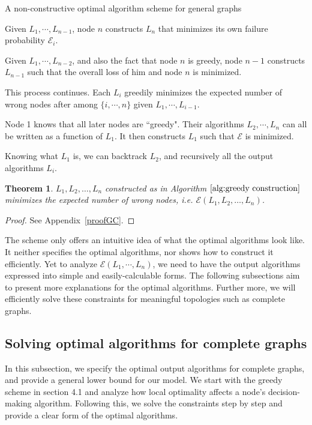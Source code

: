 \documentclass[a4paper,UKenglish]{lipics}
\newtheorem{thm}{Theorem}[section] %
\theoremstyle{definition}
\begin{document}
\begin{algorithm}[htb]
\caption{A non-constructive optimal algorithm scheme for general graphs}
\begin{algorithmic}[1]
\label{alg:greedy construction}
\STATE Given $L_1, \dotsb, L_{n-1}$, node $n$ constructs $L_n$ that minimizes its own failure probability $\mathcal{E}_i$.

\STATE Given $L_1, \dotsb, L_{n-2}$, and also the fact that node $n$ is greedy,
		 node $n - 1$ constructs $L_{n-1}$ such that the overall loss of him and node $n$ is minimized.

\STATE This process continues. Each $L_i$ greedily minimizes the expected number of wrong nodes after among $\{i, \dotsb, n\}$
		 given $L_1, \dotsb, L_{i-1}$. 

\STATE Node 1 knows that all later nodes are ``greedy".
	Their algorithms $L_2, \dotsb, L_n$ can all be written as a function of $L_1$. 
	It then constructs $L_1$ such that $\mathcal{E}$ is minimized.

\STATE Knowing what $L_1$ is, we can backtrack $L_2$, and recursively all the output algorithms $L_i$.
\end{algorithmic}
\end{algorithm}

\begin{thm}
\label{localimpliesoverall}
$L_1, L_2, \dots, L_n$ constructed as in Algorithm $\ref{alg:greedy construction}$ minimizes the expected number of wrong nodes, 
	i.e. $\mathcal{E}(L_1, L_2, \dots, L_n)$.
\end{thm}
\begin{proof}
See Appendix~\ref{proofGC}.
\end{proof}

The scheme only offers an intuitive idea of what the optimal algorithms look like.
It neither specifies the optimal algorithms, nor shows how to construct it efficiently.  
Yet to analyze $\mathcal{E}(L_1, \dotsb, L_n)$, we need to have the output algorithms expressed into simple and easily-calculable forms. 
The following subsections aim to present more explanations for the optimal algorithms. 
Further more, we will efficiently solve these constraints for meaningful topologies such as complete graphs.


\subsection {Solving optimal algorithms for complete graphs}
In this subsection, we specify the optimal output algorithms for complete graphs,
	and provide a general lower bound for our model.
We start with the greedy scheme in section 4.1 and analyze how local optimality affects a node's decision-making algorithm.
Following this, we solve the constraints step by step and provide a clear form of the optimal algorithms.
\end{document}
